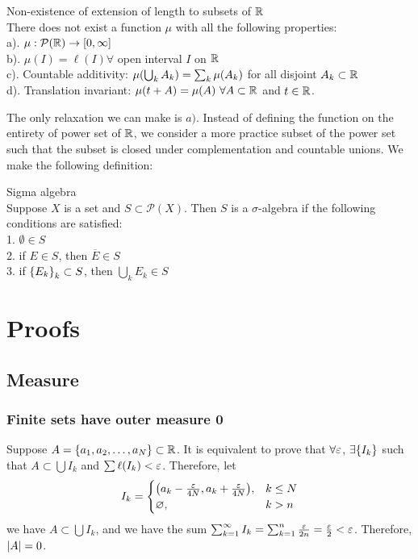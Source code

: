 \begin{prop}{Non-existence of extension of length to  subsets of ${\mathbb{R}}$}\\
	There does not exist a function $\mu$ with all the following properties:\\
	a). $\mu: \mathcal{P}({\mathbb{R}})\rightarrow [0, \infty]$\\
	b). $\mu(I) = \ell(I) \forall$ open interval $I$ on ${\mathbb{R}}$\\
	c). Countable additivity: $\mu\qty(\bigcup_k A_k) = \sum_k \mu(A_k)$ for all disjoint $A_k\subset {\mathbb{R}}$\\
	d). Translation invariant: $\mu(t+A) = \mu(A) \ \forall A\subset {\mathbb{R}}$ and $t\in {\mathbb{R}}$. 
\end{prop}

\noindent The only relaxation we can make is $a).$ Instead of defining the function on the entirety of power set of ${\mathbb{R}}$, we consider a more practice subset of the power set such that the subset is closed under complementation and countable unions. We make the following definition: \\

\begin{df}{Sigma algebra} \\
	Suppose $X$ is a set and $S\subset \mathcal{P}(X)$. Then $S$ is a $\sigma$-algebra if the following conditions are satisfied:\\
	1. $\emptyset \in S$\\
	2. if $E\in S$, then $\overline E\in S$\\
	3. if $\qty{E_k}_k\subset S$, then $\bigcup_k E_k \in S$
\end{df}



\newpage
\appendix

\section{Proofs}
\setcounter{subsection}{1}
\subsection{Measure}

\subsubsection{Finite sets have outer measure 0}\label{prof:finite set}

\begin{prf*}
Suppose $A = \qty{a_1, a_2, \dots, a_N}\subset {\mathbb{R}}$. It is equivalent to prove that $\forall {\varepsilon}$, $\exists \qty{I_k}$ such that $A\subset \bigcup I_k$ and $\sum \ell(I_k) <{\varepsilon}$. Therefore, let 
$$I_k = \begin{cases}
    \qty(a_k - \frac{{\varepsilon}}{4N}, a_k + \frac{{\varepsilon}}{4N}), & k\leq N\\
    \varnothing, & k>n
\end{cases}$$
we have $A\subset \bigcup I_k$, and we have the sum $\sum_{k=1}^\infty I_k = \sum_{k=1}^n \frac{{\varepsilon}}{2n} = \frac{{\varepsilon}}{2} < {\varepsilon}$. Therefore, $\abs{A} = 0$.
\end{prf*}

